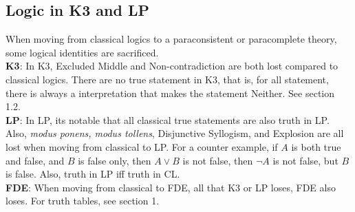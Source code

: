 \documentclass{article}
\begin{document}
\newpage
\subsection{Logic in K3 and LP}
When moving from classical logics to a paraconsistent or paracomplete theory, some logical identities are sacrificed.\\

\noindent \textbf{K3}: In K3, Excluded Middle and Non-contradiction are both lost compared to classical logics. 
There are no true statement in K3, that is, for all statement, there is always a 
interpretation that makes the statement Neither. See section 1.2.\\

\noindent \textbf{LP}: In LP, its notable that all classical true statements are also truth in LP. Also,
\emph{modus ponens, modus tollens}, Disjunctive Syllogism, and Explosion are all lost when moving from classical to LP.
For a counter example, if $A$ is both true and false, and $B$ is false only, then $A\vee B$ is not false, 
then $\lnot A$ is not false, but $B$ is false. Also, truth in LP iff truth in CL.\\

\noindent \textbf{FDE}: When moving from classical to FDE, all that K3 or LP loses, FDE also loses. For 
truth tables, see section 1.\\
\end{document}
